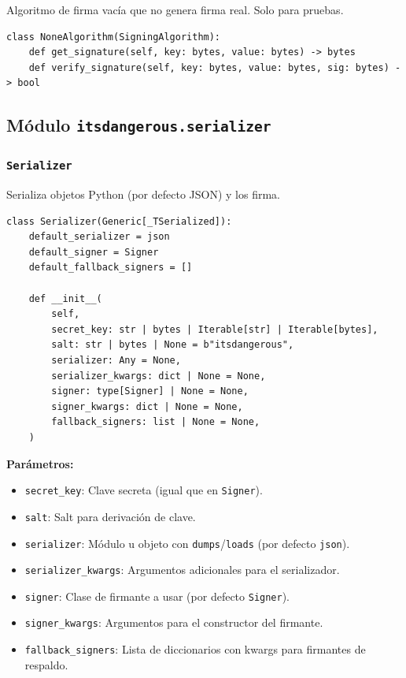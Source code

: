 \documentclass[11pt,a4paper]{article}
\begin{document}
Algoritmo de firma vacía que no genera firma real. Solo para pruebas.


\begin{lstlisting}
class NoneAlgorithm(SigningAlgorithm):
    def get_signature(self, key: bytes, value: bytes) -> bytes
    def verify_signature(self, key: bytes, value: bytes, sig: bytes) -> bool
\end{lstlisting}


\subsection*{Módulo \texttt{itsdangerous.serializer}}


\subsubsection*{\texttt{Serializer}}


Serializa objetos Python (por defecto JSON) y los firma.


\begin{lstlisting}
class Serializer(Generic[_TSerialized]):
    default_serializer = json
    default_signer = Signer
    default_fallback_signers = []

    def __init__(
        self,
        secret_key: str | bytes | Iterable[str] | Iterable[bytes],
        salt: str | bytes | None = b"itsdangerous",
        serializer: Any = None,
        serializer_kwargs: dict | None = None,
        signer: type[Signer] | None = None,
        signer_kwargs: dict | None = None,
        fallback_signers: list | None = None,
    )
\end{lstlisting}


\textbf{Parámetros:}


\begin{itemize}[leftmargin=*,topsep=2pt,itemsep=1pt]
  \item \texttt{secret\_key}: Clave secreta (igual que en \texttt{Signer}).
  \item \texttt{salt}: Salt para derivación de clave.
  \item \texttt{serializer}: Módulo u objeto con \texttt{dumps}/\texttt{loads} (por defecto \texttt{json}).
  \item \texttt{serializer\_kwargs}: Argumentos adicionales para el serializador.
  \item \texttt{signer}: Clase de firmante a usar (por defecto \texttt{Signer}).
  \item \texttt{signer\_kwargs}: Argumentos para el constructor del firmante.
  \item \texttt{fallback\_signers}: Lista de diccionarios con kwargs para firmantes de respaldo.
\end{itemize}
\end{document}
